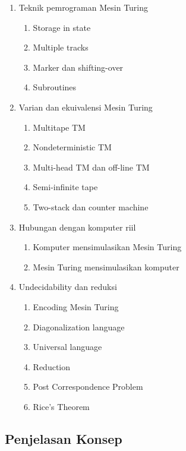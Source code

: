 \begin{enumerate}
    \item \ppaham Teknik pemrograman Mesin Turing
    \begin{enumerate}
        \item \ppaham Storage in state
        \item \ppaham Multiple tracks
        \item \ppaham Marker dan shifting-over
        \item \ppaham Subroutines
    \end{enumerate}
    \item \ppaham Varian dan ekuivalensi Mesin Turing
    \begin{enumerate}
        \item \ppaham Multitape TM
        \item \ppaham Nondeterministic TM
        \item \ppaham Multi-head TM dan off-line TM
        \item \ppaham Semi-infinite tape
        \item \ppaham Two-stack dan counter machine
    \end{enumerate}
    \item \ppaham Hubungan dengan komputer riil
    \begin{enumerate}
        \item \ppaham Komputer mensimulasikan Mesin Turing
        \item \ppaham Mesin Turing mensimulasikan komputer
    \end{enumerate}
    \item \pwajib Undecidability dan reduksi
    \begin{enumerate}
        \item \pwajib Encoding Mesin Turing
        \item \pwajib Diagonalization language
        \item \pwajib Universal language
        \item \pwajib Reduction
        \item \ppaham Post Correspondence Problem
        \item \pwajib Rice's Theorem
    \end{enumerate}
\end{enumerate}

\subsection{Penjelasan Konsep}

